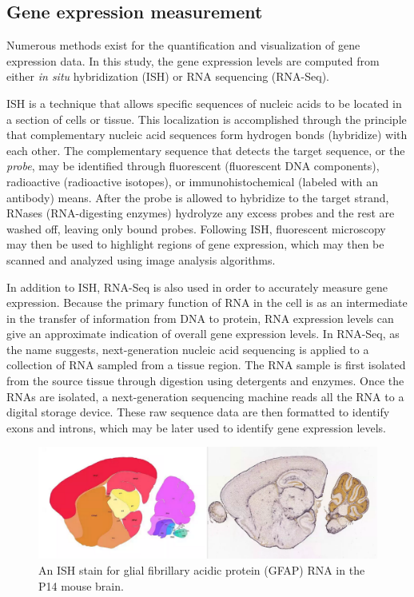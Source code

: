 \documentclass[12pt,oneside,onecolumn,a4paper]{article}
\begin{document}
\subsection{Gene expression measurement}
Numerous methods exist for the quantification and visualization of gene expression data. In this study, the gene expression levels are computed from either \textit{in situ} hybridization (ISH) or RNA sequencing (RNA-Seq). 

ISH is a technique that allows specific sequences of nucleic acids to be located in a section of cells or tissue. This localization is accomplished through the principle that complementary nucleic acid sequences form hydrogen bonds (hybridize) with each other. The complementary sequence that detects the target sequence, or the \textit{probe}, may be identified through fluorescent (fluorescent DNA components), radioactive (radioactive isotopes), or immunohistochemical (labeled with an antibody) means. After the probe is allowed to hybridize to the target strand, RNases (RNA-digesting enzymes) hydrolyze any excess probes and the rest are washed off, leaving only bound probes. Following ISH, fluorescent microscopy may then be used to highlight regions of gene expression, which may then be scanned and analyzed using image analysis algorithms. \citep{Angerer_1991}

In addition to ISH, RNA-Seq is also used in order to accurately measure gene expression. Because the primary function of RNA in the cell is as an intermediate in the transfer of information from DNA to protein, RNA expression levels can give an approximate indication of overall gene expression levels. In RNA-Seq, as the name suggests, next-generation nucleic acid sequencing is applied to a collection of RNA sampled from a tissue region. The RNA sample is first isolated from the source tissue through digestion using detergents and enzymes. Once the RNAs are isolated, a next-generation sequencing machine reads all the RNA to a digital storage device. These raw sequence data are then formatted to identify exons and introns, which may be later used to identify gene expression levels. 
\citep{Wang_2009}
\begin{figure}[h!]
\begin{center}
\includegraphics[width=0.8\columnwidth]{figures/ISH/ISH}
\caption{An ISH stain for glial fibrillary acidic protein (GFAP) RNA in the P14 mouse brain.%
}
\end{center}
\end{figure}
\end{document}
